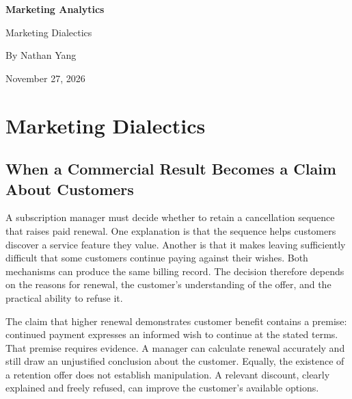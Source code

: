 

\begin{titlepage}
\color{IlliniBlue}
\vspace*{1.2cm}
{\Huge\bfseries Marketing Analytics\par}
\vspace{.8cm}
{\LARGE Marketing Dialectics\par}
\vspace{1.1cm}
\noindent{\color{IlliniOrange}\rule{\textwidth}{2pt}}\par
\vspace{.7cm}
{\large By Nathan Yang\par}
{\large November 27, 2026\par}
\end{titlepage}
\hypersetup{pageanchor=true}
\renewcommand{\contentsname}{Table of Contents}
\begingroup
\setlength{\parskip}{2pt}
\tableofcontents
\endgroup
\clearpage
{}
\setcounter{chapter}{8}
\hypertarget{M09-marketing-dialectics}{%
\chapter{Marketing Dialectics}\label{M09-marketing-dialectics}}
\par\medskip

\noindent {}

\hypertarget{M09-when-a-commercial-result-becomes-a-claim-about-customers}{%
\section{When a Commercial Result Becomes a Claim About
Customers}\label{M09-when-a-commercial-result-becomes-a-claim-about-customers}}

\noindent \noindent A subscription manager must decide whether to retain a
cancellation sequence that raises paid renewal. One explanation is that
the sequence helps customers discover a service feature they value.
Another is that it makes leaving sufficiently difficult that some
customers continue paying against their wishes. Both mechanisms can
produce the same billing record. The decision therefore depends on the
reasons for renewal, the customer's understanding of the offer, and the
practical ability to refuse it.

The claim that higher renewal demonstrates customer benefit contains a
premise: continued payment expresses an informed wish to continue at the
stated terms. That premise requires evidence. A manager can calculate
renewal accurately and still draw an unjustified conclusion about the
customer. Equally, the existence of a retention offer does not establish
manipulation. A relevant discount, clearly explained and freely refused,
can improve the customer's available options.

